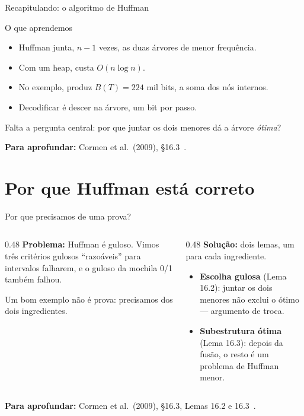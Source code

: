 \documentclass[aspectratio=169,xcolor=table]{beamer}
\newcommand{\fonte}[1]{%
  \vfill
  {\tiny\color{gray!55!black}\textbf{Para aprofundar:} #1\par}%
}
\begin{document}
\begin{frame}{Recapitulando: o algoritmo de Huffman}
  \begin{block}{O que aprendemos}
    \begin{itemize}
      \item Huffman junta, $n - 1$ vezes, as duas árvores de menor frequência.
      \item Com um heap, custa $O(n \log n)$.
      \item No exemplo, produz $B(T) = 224$ mil bits, a soma dos nós internos.
      \item Decodificar é descer na árvore, um bit por passo.
    \end{itemize}
  \end{block}
  {\small Falta a pergunta central: por que juntar os dois menores dá a árvore
  \emph{ótima}?\par}
  \fonte{Cormen et al.\ (2009), \S 16.3~\cite{cormen2009introduction}.}
\end{frame}

\section{Por que Huffman está correto}

\begin{frame}{Por que precisamos de uma prova?}
  \begin{columns}[T]
    \begin{column}{0.48\textwidth}
      \textbf{Problema:} Huffman é guloso. Vimos três critérios gulosos ``razoáveis'' para
      intervalos falharem, e o guloso da mochila 0/1 também falhou.
      \medskip

      {\small Um bom exemplo não é prova: precisamos dos dois ingredientes.}
    \end{column}
    \begin{column}{0.48\textwidth}
      \textbf{Solução:} dois lemas, um para cada ingrediente.
      \medskip

      \begin{itemize}
        \small
        \item \textbf{Escolha gulosa} (Lema 16.2): juntar os dois menores não exclui o ótimo
              --- argumento de troca.
        \item \textbf{Subestrutura ótima} (Lema 16.3): depois da fusão, o resto é um problema
              de Huffman menor.
      \end{itemize}
    \end{column}
  \end{columns}
  \fonte{Cormen et al.\ (2009), \S 16.3, Lemas 16.2 e 16.3~\cite{cormen2009introduction}.}
\end{frame}
\end{document}
